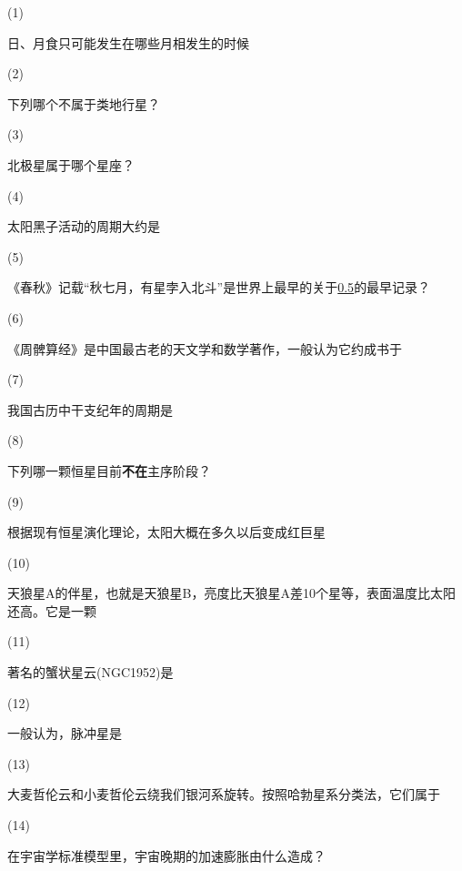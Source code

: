 \documentclass[CJK]{article}
\begin{document}
\bitem
\item[(1)]{日、月食只可能发生在哪些月相发生的时候

}    
\item[(2)]{下列哪个不属于类地行星？
  
}
\item[(3)]{北极星属于哪个星座？

}
\item[(4)]{太阳黑子活动的周期大约是
  
}
\item[(5)]{《春秋》记载“秋七月，有星孛入北斗”是世界上最早的关于\uline{0.5}的最早记录？

}  
\item[(6)]{《周髀算经》是中国最古老的天文学和数学著作，一般认为它约成书于

}
\item[(7)]{我国古历中干支纪年的周期是

}
\item[(8)]{下列哪一颗恒星目前{\bf 不在}主序阶段？

}    
\item[(9)]{根据现有恒星演化理论，太阳大概在多久以后变成红巨星

}  
\item[(10)]{天狼星A的伴星，也就是天狼星B，亮度比天狼星A差10个星等，表面温度比太阳还高。它是一颗

}
\item[(11)]{著名的蟹状星云(NGC1952)是

}  
\item[(12)]{一般认为，脉冲星是

}
\item[(13)]{大麦哲伦云和小麦哲伦云绕我们银河系旋转。按照哈勃星系分类法，它们属于

}  
\item[(14)]{在宇宙学标准模型里，宇宙晚期的加速膨胀由什么造成？

}  
\end{document}
